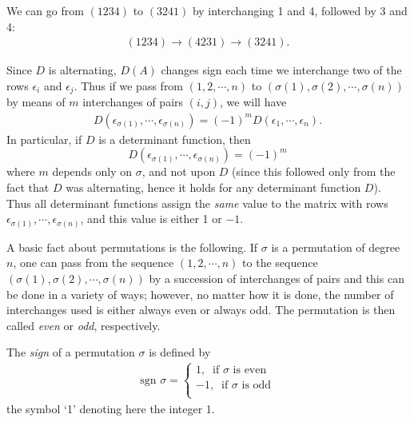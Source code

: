 \documentclass[12pt,letterpaper,reqno]{article}
\numberwithin{equation}{section}
\newcommand{\ti}[1]{\textit{#1}}
\begin{document}
\begin{example}
	We can go from $(1234)$ to $(3241)$ by interchanging 1 and 4, followed by 3 and 4:
	\begin{align*}
		(1234) \to (4231) \to (3241).
	\end{align*}	
\end{example}
Since $D$ is alternating, $D(A)$ changes sign each time we interchange two of the rows $\epsilon_i$ and $\epsilon_j$. Thus if we pass from $(1,2,\cdots,n)$ to $(\sigma(1),\sigma(2),\cdots,\sigma(n))$ by means of $m$ interchanges of pairs $(i,j)$, we will have
\begin{align*}
	D(\epsilon_{\sigma(1)},\cdots,\epsilon_{\sigma(n)})=(-1)^m D(\epsilon_1,\cdots,\epsilon_n).
\end{align*}
In particular, if $D$ is a determinant function, then
\begin{equation}\label{eq:def_of_m}
	D(\epsilon_{\sigma(1)},\cdots,\epsilon_{\sigma(n)})=(-1)^m
\end{equation}
where $m$ depends only on $\sigma$, and not upon $D$ (since this followed only from the fact that $D$ was alternating, hence it holds for any determinant function $D$). Thus all determinant functions assign the \ti{same} value to the matrix with rows $\epsilon_{\sigma(1)},\cdots,\epsilon_{\sigma(n)}$, and this value is either 1 or $-1$.

A basic fact about permutations is the following. If $\sigma$ is a permutation of degree $n$, one can pass from the sequence $(1,2,\cdots,n)$ to the sequence $(\sigma(1), \sigma(2),\cdots, \sigma(n))$ by a succession of interchanges of pairs and this can be done in a variety of ways; however, no matter how it is done, the number of interchanges used is either always even or always odd. The permutation is then called \ti{even} or \ti{odd}, respectively.

\begin{defn}
	The \ti{sign} of a permutation $\sigma$ is defined by
	\begin{align*}
		\text{sgn }\sigma  =\begin{cases}
			1, \ \text{ if $\sigma$ is even} \\
			-1, \ \text{ if $\sigma$ is odd} \\ 
		\end{cases}
	\end{align*}
the symbol `1' denoting here the integer 1.
\end{defn}
\end{document}

